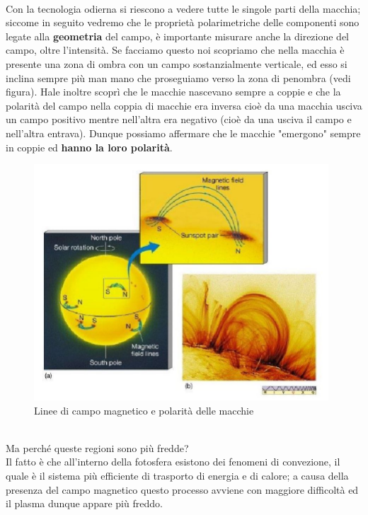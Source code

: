 \documentclass[a4paper,11pt]{article}
\begin{document}
        \\
        Con la tecnologia odierna si riescono a vedere tutte le singole parti della macchia; siccome in seguito vedremo che le proprietà polarimetriche delle componenti sono legate alla \textbf{geometria} del campo, è importante misurare anche la direzione del campo, oltre l'intensità.
        Se facciamo questo noi scopriamo che nella macchia è presente una zona di ombra con un campo sostanzialmente verticale, ed esso si inclina sempre più man mano che proseguiamo verso la zona di penombra (vedi figura).
        Hale inoltre scoprì che le macchie nascevano sempre a coppie e che la polarità del campo nella coppia di macchie era inversa cioè da una macchia usciva un campo positivo mentre nell'altra era negativo (cioè da una usciva il campo e nell'altra entrava).
        Dunque possiamo affermare che le macchie "emergono" sempre in coppie ed \textbf{hanno la loro polarità}.
        \\
        \begin{figure}[h!!]
            \centering
                \includegraphics[width=11cm]{2dic/CampiMagneticiMacchie.jpg}
                \caption{Linee di campo magnetico e polarità delle macchie}
            \label{fig:CampoMag}
        \end{figure}
        \\
        Ma perché queste regioni sono più fredde? \\
        Il fatto è che all'interno della fotosfera esistono dei fenomeni di convezione, il quale è il sistema più efficiente di trasporto di energia e di calore; a causa della presenza del campo magnetico questo processo avviene con maggiore difficoltà ed il plasma dunque appare più freddo.
        \\
\end{document}
